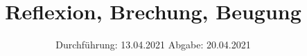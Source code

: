 

\subject{V400}
\title{Reflexion, Brechung, Beugung}
\date{%
  Durchführung: 13.04.2021
  \hspace{3em}
  Abgabe: 20.04.2021
}



\maketitle
\thispagestyle{empty}
\tableofcontents
\newpage







\printbibliography{}


